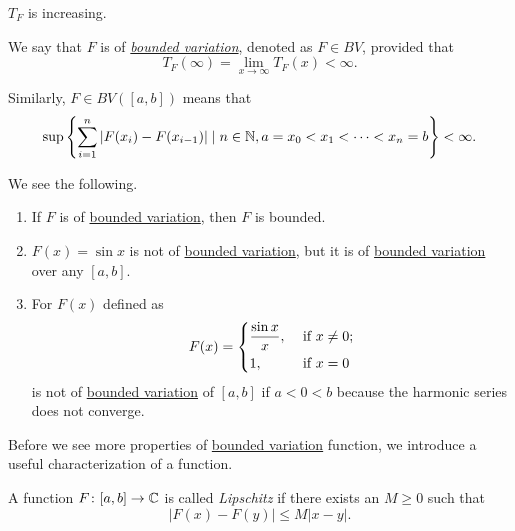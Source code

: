 \begin{remark}
	\(T_F\) is increasing.
\end{remark}

\begin{definition}\label{def:bounded-variation}
	We say that \(F\) is of \emph{\hyperref[def:bounded-variation]{bounded variation}}, denoted as \(F \in BV\), provided that
	\[
		T_F(\infty) = \lim_{x \to \infty} T_F(x) < \infty.
	\]

	Similarly, \(F \in BV([a,b])\) means that
	\[
		\sup \left\{\sum_{i=1}^n \left\vert F(x_i) - F(x_{i-1}) \right\vert \mid n \in \mathbb{\MakeUppercase{n}} , a = x_0 < x_1 < \cdots < x_n = b\right\} < \infty.
	\]
\end{definition}

\begin{remark}
	We see the following.
	\begin{enumerate}[(1)]
		\item If \(F\) is of \hyperref[def:bounded-variation]{bounded variation}, then \(F\) is bounded.
		\item \(F(x) = \sin x\) is not of \hyperref[def:bounded-variation]{bounded variation}, but it is of \hyperref[def:bounded-variation]{bounded variation}
		      over any \([a,b]\).
		\item For \(F(x)\) defined as
		      \[
			      F(x) = \begin{dcases}
				      \frac{\sin x}{x}, & \text{ if } x\neq 0 ; \\
				      1,                & \text{ if } x = 0
			      \end{dcases}
		      \]
		      is not of \hyperref[def:bounded-variation]{bounded variation} of \([a,b]\) if \(a < 0 < b\) because the harmonic series does not converge.
	\end{enumerate}
\end{remark}

Before we see more properties of \hyperref[def:bounded-variation]{bounded variation} function, we introduce a useful characterization of a function.
\begin{definition}[Lipschitz]\label{def:Lipschitz}
	A function \(F \colon [a,b] \to \mathbb{\MakeUppercase{c}} \) is called \emph{Lipschitz} if there exists an
	\(M \geq 0\) such that
	\[
		\left\vert F(x) - F(y) \right\vert \leq M \left\vert x - y \right\vert.
	\]
\end{definition}

